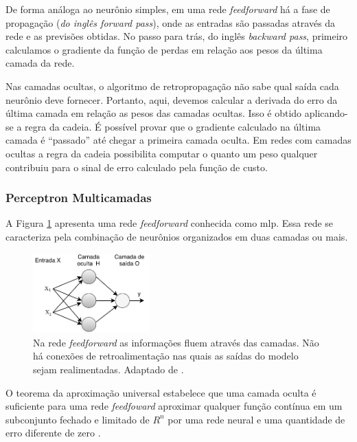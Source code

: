 De forma análoga ao neurônio simples, em uma rede \textit{feedforward} há a fase de propagação (\textit{do inglês forward pass}), onde as entradas são passadas através da rede e as previsões obtidas. No passo para trás, do inglês \textit{backward pass}, primeiro calculamos o gradiente da função de perdas em relação aos pesos da última camada da rede.

Nas camadas ocultas, o algoritmo de retropropagação não sabe qual saída cada neurônio deve fornecer. Portanto, aqui, devemos calcular a derivada do erro da última camada em relação as pesos das camadas ocultas. Isso é obtido aplicando-se a regra da cadeia. É possível provar que o gradiente calculado na última camada é ``passado'' até chegar a primeira camada oculta.    
Em redes com camadas ocultas a regra da cadeia possibilita computar o quanto um peso qualquer contribuiu para o sinal de erro calculado pela função de custo.  

\subsubsection{Perceptron Multicamadas}

A Figura \ref{fig:feedforward} apresenta uma rede \textit{feedforward} conhecida como \gls{mlp}. Essa rede se caracteriza pela combinação de neurônios organizados em duas camadas ou mais. 

\begin{figure}[h]
	\centering
	\includegraphics[width=0.4\textwidth]{figuras/feedforward.pdf}
	\caption[Rede \textit{feedforward} de 2 camadas]{Na rede \textit{feedforward} as informações fluem através das camadas. Não há conexões de retroalimentação nas quais as saídas do modelo sejam realimentadas. Adaptado de \cite{Goodfellow2016}.}
	\label{fig:feedforward}
\end{figure}


O teorema da aproximação universal \cite{hornik1989multilayer} estabelece que uma camada oculta é suficiente para uma rede \textit{feedfoward} aproximar qualquer função contínua em um subconjunto fechado e limitado de $R^{n}$ por uma rede neural e uma quantidade de erro diferente de zero \cite{Goodfellow2016}.

